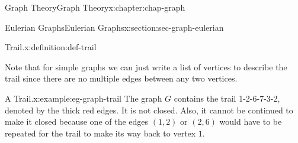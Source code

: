\documentclass[oneside,10pt,]{book}
\numberwithin{equation}{section}
\begin{document}
\begin{chapterptx}{Graph Theory}{}{Graph Theory}{}{}{x:chapter:chap-graph}
\begin{sectionptx}{Eulerian Graphs}{}{Eulerian Graphs}{}{}{x:section:sec-graph-eulerian}
\begin{definition}{Trail.}{x:definition:def-trail}
\end{definition}
Note that for simple graphs we can just write a list of vertices to describe the trail since there are no multiple edges between any two vertices.%
\begin{example}{A Trail.}{x:example:eg-graph-trail}%
The graph \(G\) contains the trail 1-2-6-7-3-2, denoted by the thick red edges. It is not closed. Also, it cannot be continued to make it closed because one of the edges \((1,2)\) or \((2,6)\) would have to be repeated for the trail to make its way back to vertex \(1\).%
\begin{sidebyside}{1}{0.325}{0.325}{0}%
\begin{sbspanel}{0.35}%
\end{sbspanel}
\end{sidebyside}
\end{example}
\end{sectionptx}
\end{chapterptx}
\end{document}
